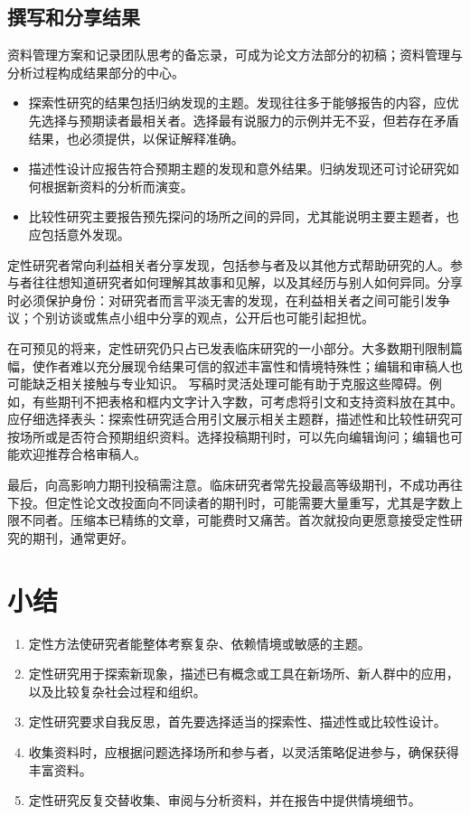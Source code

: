 \subsection{撰写和分享结果}
资料管理方案和记录团队思考的备忘录，可成为论文方法部分的初稿；资料管理与分析过程构成结果部分的中心。
\begin{itemize}
\item 探索性研究的结果包括归纳发现的主题。发现往往多于能够报告的内容，应优先选择与预期读者最相关者。选择最有说服力的示例并无不妥，但若存在矛盾结果，也必须提供，以保证解释准确。
\item 描述性设计应报告符合预期主题的发现和意外结果。归纳发现还可讨论研究如何根据新资料的分析而演变。
\item 比较性研究主要报告预先探问的场所之间的异同，尤其能说明主要主题者，也应包括意外发现。
\end{itemize}

定性研究者常向利益相关者分享发现，包括参与者及以其他方式帮助研究的人。参与者往往想知道研究者如何理解其故事和见解，以及其经历与别人如何异同。分享时必须保护身份：对研究者而言平淡无害的发现，在利益相关者之间可能引发争议；个别访谈或焦点小组中分享的观点，公开后也可能引起担忧。

在可预见的将来，定性研究仍只占已发表临床研究的一小部分。大多数期刊限制篇幅，使作者难以充分展现令结果可信的叙述丰富性和情境特殊性；编辑和审稿人也可能缺乏相关接触与专业知识。
写稿时灵活处理可能有助于克服这些障碍。例如，有些期刊不把表格和框内文字计入字数，可考虑将引文和支持资料放在其中。应仔细选择表头：探索性研究适合用引文展示相关主题群，描述性和比较性研究可按场所或是否符合预期组织资料。选择投稿期刊时，可以先向编辑询问；编辑也可能欢迎推荐合格审稿人。

最后，向高影响力期刊投稿需注意。临床研究者常先投最高等级期刊，不成功再往下投。但定性论文改投面向不同读者的期刊时，可能需要大量重写，尤其是字数上限不同者。压缩本已精练的文章，可能费时又痛苦。首次就投向更愿意接受定性研究的期刊，通常更好。

\section{小结}
\begin{enumerate}
\item 定性方法使研究者能整体考察复杂、依赖情境或敏感的主题。
\item 定性研究用于探索新现象，描述已有概念或工具在新场所、新人群中的应用，以及比较复杂社会过程和组织。
\item 定性研究要求自我反思，首先要选择适当的探索性、描述性或比较性设计。
\item 收集资料时，应根据问题选择场所和参与者，以灵活策略促进参与，确保获得丰富资料。
\item 定性研究反复交替收集、审阅与分析资料，并在报告中提供情境细节。
\end{enumerate}

